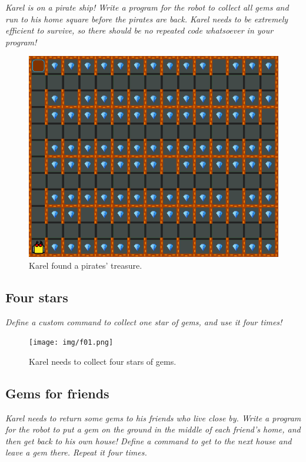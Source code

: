 {\em Karel is on a pirate ship! Write a program for the robot to collect all 
gems and run to his home square before the pirates are back. Karel 
needs to be extremely efficient to survive, so there should be 
no repeated code whatsoever in your program!}\\[-9mm]

\begin{figure}[!ht]
\begin{center}
\includegraphics[height=0.4\textwidth]{img/f05.png}
\end{center}
\vspace{-4mm}
\caption{Karel found a pirates' treasure.}
\label{fig:f05}
\vspace{-1.2cm}
\end{figure}

\subsection{Four stars}

{\em Define a custom command to collect one star of gems, and use it four times!}\\[-8mm]

\begin{figure}[!ht]
\begin{center}
\texttt{[image: img/f01.png]}
\end{center}
\vspace{-4mm}
\caption{Karel needs to collect four stars of gems.}
\label{fig:f01}
\vspace{-10mm}
\end{figure}
\newpage

\subsection{Gems for friends}

{\em Karel needs to return some gems to his friends who live close by. Write a program for the robot to put a gem on the ground in the middle of each friend's home, and then get back to his own house! Define a command to get to the next house and leave a gem there. Repeat it four times.}\\[-7mm]


